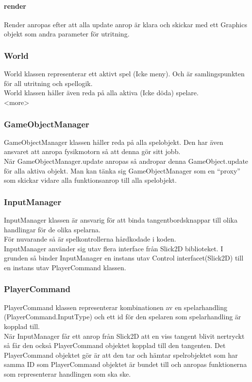\paragraph{render}
Render anropas efter att alla update anrop är klara och skickar med ett Graphics objekt som andra parameter för utritning.\\
\subsubsection{World}
World klassen representerar ett aktivt spel (Icke meny). Och är samlingspunkten för all utritning och spellogik.\\
World klassen håller även reda på alla aktiva (Icke döda) spelare.\\
<more>\\
\subsubsection{GameObjectManager}
GameObjectManager klassen håller reda på alla spelobjekt. Den har även ansvaret att anropa fysikmotorn så att denna gör sitt jobb.\\
När GameObjectManager.update anropas så andropar denna GameObject.update för alla aktiva objekt. Man kan tänka sig GameObjectManager som en ``proxy'' som skickar vidare alla funktionsanrop till alla spelobjekt.\\
\subsubsection{InputManager}
InputManager klassen är ansvarig för att binda tangentbordsknappar till olika handlingar för de olika spelarna.\\
För nuvarande så är spelkontrollerna hårdkodade i koden.\\
InputManager använder sig utav flera interface från Slick2D biblioteket. I grunden så binder InputManager en instans utav Control interfacet(Slick2D) till en instans utav PlayerCommand klassen.\\
\subsubsection{PlayerCommand}
PlayerCommand klassen representerar kombinationen av en spelarhandling (PlayerCommand.InputType) och ett id för den spelaren som spelarhandling är kopplad till.\\
När InputManager får ett anrop från Slick2D att en viss tangent blivit nertryckt så får den också PlayerCommand objektet kopplad till den tangenten. Det PlayerCommand objektet gör är att den tar och hämtar spelrobjektet som har samma ID som PlayerCommand objektet är bundet till och anropas funktionerna som representerar handlingen som ska ske.\\
